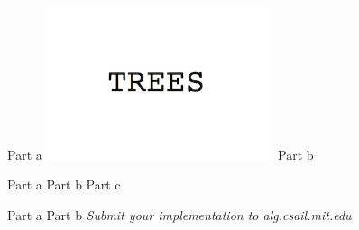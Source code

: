 \documentclass[12pt,twoside]{article}
\begin{document}

\begin{problems}

\problem  %

\begin{problemparts}
\problempart Part a  %
\includegraphics[width=0.5\textwidth]{img.jpg}
\problempart Part b  %
\end{problemparts}

\problem  %

\begin{problemparts}
\problempart Part a %
\problempart Part b %
\problempart Part c %
\end{problemparts}

\problem  %

\begin{problemparts}
\problempart Part a %
\problempart Part b %
\problempart \emph{Submit your implementation to alg.csail.mit.edu}
\end{problemparts}

\end{problems}
\end{document}
